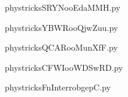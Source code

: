     

    \clearpage
    


    \newcommand{\CaptionFigSRYNooEdaMMH}{<+Type your caption here+>}
    \begin{center}
        
    \end{center}
    phystricksSRYNooEdaMMH.py

    

    \clearpage
    


    \newcommand{\CaptionFigYBWRooQjwZuu}{<+Type your caption here+>}
    \begin{center}
        
    \end{center}
    phystricksYBWRooQjwZuu.py

    

    \clearpage
    


    \newcommand{\CaptionFigQCARooMunXfF}{<+Type your caption here+>}
    \begin{center}
        
    \end{center}
    phystricksQCARooMunXfF.py

    

    \clearpage
    


    \newcommand{\CaptionFigCFWIooWDSwRD}{<+Type your caption here+>}
    \begin{center}
        
    \end{center}
    phystricksCFWIooWDSwRD.py

    

    \clearpage
    


    \newcommand{\CaptionFigFnInterrobgepC}{<+Type your caption here+>}
    \begin{center}
        
    \end{center}
    phystricksFnInterrobgepC.py

    

    \clearpage
    


